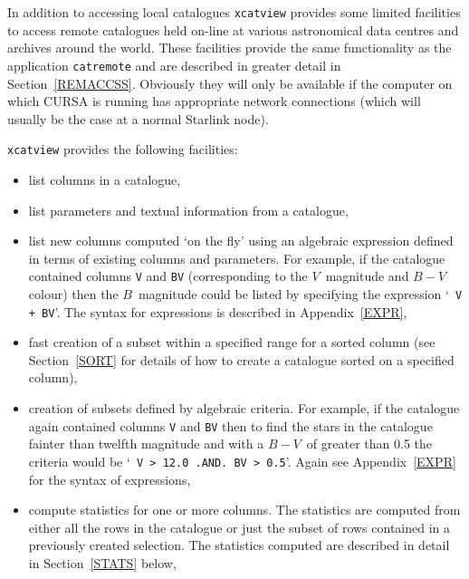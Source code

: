 \documentclass[twoside,11pt]{article}
\renewcommand{\_}{\texttt{\symbol{95}}}
\begin{document}
In addition to accessing local catalogues {\tt xcatview} provides some
limited facilities to access remote catalogues held on-line at various
astronomical data centres and archives around the world.  These facilities
provide the same functionality as the application {\tt catremote} and
are described in greater detail in Section~\ref{REMACCSS}.  Obviously
they will only be available if the computer on which CURSA is running
has appropriate network connections (which will usually be the case at
a normal Starlink node).

{\tt xcatview} provides the following facilities:

\begin{itemize}

  \item list columns in a catalogue,

  \item list parameters and textual information from a catalogue,

  \item list new columns computed `on the fly' using an algebraic
   expression defined in terms of existing columns and parameters. For
   example, if the catalogue contained columns {\tt V} and {\tt B\_V}
   (corresponding to the $V$\, magnitude and $B-V$\, colour) then the
   $B$\, magnitude  could be listed by specifying the expression `{\tt
   V + B\_V}'. The syntax for expressions is described in
   Appendix~\ref{EXPR},

  \item fast creation of a subset within a specified range for a sorted
   column (see Section~\ref{SORT} for details of how to create a
   catalogue sorted on a specified column),

  \item creation of subsets defined by algebraic criteria. For example,
   if the catalogue again contained columns {\tt V} and {\tt B\_V} then
   to find the stars in the catalogue fainter than twelfth magnitude
   and with a $B-V$\, of greater than 0.5 the criteria would be `{\tt 
   V > 12.0 .AND. B\_V > 0.5}'. Again see Appendix~\ref{EXPR} for the
   syntax of expressions,

  \item compute statistics for one or more columns.  The statistics
   are computed from either all the rows in the catalogue or just the
   subset of rows contained in a previously created selection.  The
   statistics computed are described in detail in Section~\ref{STATS}
   below,


\end{itemize}
\end{document}
